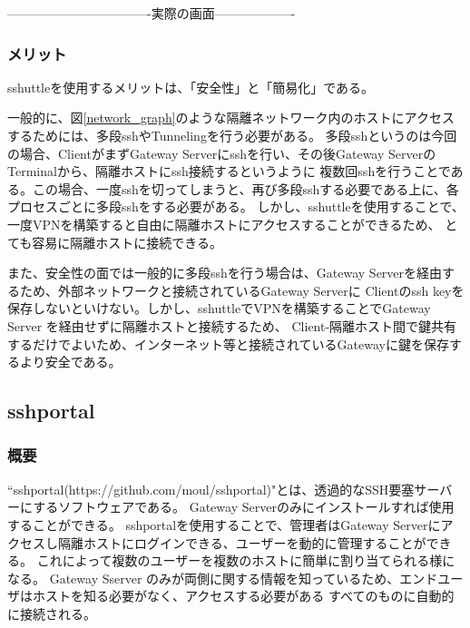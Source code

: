 \documentclass[12pt,a4paper,titlepage]{jsarticle}
\begin{document}
----------------------------------実際の画面-------------------



\subsubsection*{メリット}
sshuttleを使用するメリットは、「安全性」と「簡易化」である。\par
一般的に、図\ref{network_graph}のような隔離ネットワーク内のホストにアクセスするためには、多段sshやTunnelingを行う必要がある。
多段sshというのは今回の場合、ClientがまずGateway Serverにsshを行い、その後Gateway ServerのTerminalから、隔離ホストにssh接続するというように
複数回sshを行うことである。この場合、一度sshを切ってしまうと、再び多段sshする必要である上に、各プロセスごとに多段sshをする必要がある。
しかし、sshuttleを使用することで、一度VPNを構築すると自由に隔離ホストにアクセスすることができるため、
とても容易に隔離ホストに接続できる。\par
また、安全性の面では一般的に多段sshを行う場合は、Gateway Serverを経由するため、外部ネットワークと接続されているGateway Serverに
Clientのssh keyを保存しないといけない。しかし、sshuttleでVPNを構築することでGateway Server を経由せずに隔離ホストと接続するため、
Client-隔離ホスト間で鍵共有するだけでよいため、インターネット等と接続されているGatewayに鍵を保存するより安全である。


\subsection{sshportal}

\subsubsection*{概要}
``sshportal(https://github.com/moul/sshportal)"とは、透過的なSSH要塞サーバーにするソフトウェアである。
Gateway Serverのみにインストールすれば使用することができる。
sshportalを使用することで、管理者はGateway Serverにアクセスし隔離ホストにログインできる、ユーザーを動的に管理することができる。
これによって複数のユーザーを複数のホストに簡単に割り当てられる様になる。
Gateway Sserver のみが両側に関する情報を知っているため、エンドユーザはホストを知る必要がなく、アクセスする必要がある
すべてのものに自動的に接続される。
\end{document}
